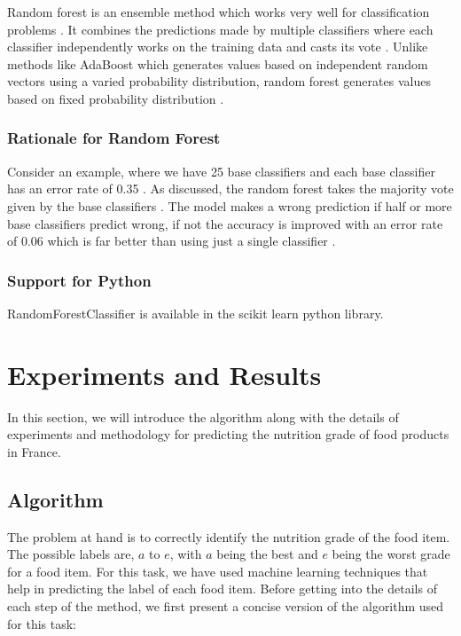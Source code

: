 \documentclass[sigconf]{acmart}
\begin{document}
Random forest is an ensemble method which works very well for classification problems \cite{book-tan}. It combines the predictions made by multiple classifiers where each classifier independently works on the training data and casts its vote \cite{book-tan}. Unlike methods like AdaBoost which generates values based on independent random vectors using a varied probability distribution, random forest generates values based on fixed probability distribution \cite{book-tan}. 

\subsubsection{Rationale for Random Forest}
Consider an example, where we have 25 base classifiers and each base classifier has an error rate of 0.35 \cite{book-tan}. As discussed, the random forest takes the majority vote given by the base classifiers \cite{book-tan}. The model makes a wrong prediction if half or more base classifiers predict wrong, if not the accuracy is improved with an error rate of 0.06 which is far better than using just a single classifier \cite{book-tan}.

\subsubsection{Support for Python} RandomForestClassifier is available in the scikit learn python library.

\section {Experiments and Results}
In this section, we will introduce the algorithm along with the details of experiments and methodology for predicting the nutrition grade of food products in France.

\subsection{Algorithm}
The problem at hand is to correctly identify the nutrition grade of the food item. The possible labels are, $a$ to $e$, with $a$ being the best and $e$ being the worst grade for a food item. For this task, we have used machine learning techniques that help in predicting the label of each food item. Before getting into the details of each step of the method, we first present a concise version of the algorithm used for this task:
\end{document}
